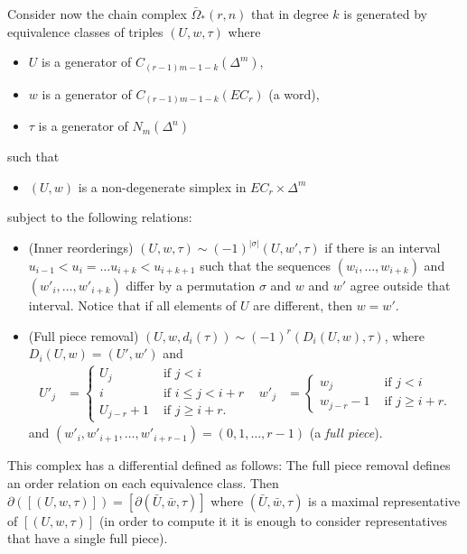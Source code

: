 Consider now the chain complex $\bar{\Omega}_*(r,n)$ that in degree $k$ is generated by equivalence classes of triples $(U,w,\tau)$ where 
\begin{itemize}
	\item $U$ is a generator of $C_{(r-1)m-1-k}(\Delta^m)$,
	\item $w$ is a generator of $C_{(r-1)m-1-k}(EC_r)$ (a word),
	\item $\tau$ is a generator of $N_m(\Delta^n)$
\end{itemize}
such that
\begin{itemize}
	\item $(U,w)$ is a non-degenerate simplex in $EC_r\times \Delta^m$
\end{itemize}
subject to the following relations:
\begin{itemize}
	\item (Inner reorderings) $(U,w,\tau)\sim (-1)^{|\sigma|}(U,w',\tau)$ if there is an interval $u_{i-1}<u_i =\ldots u_{i+k}<u_{i+k+1}$ such that the sequences $(w_i,\ldots,w_{i+k})$ and $(w'_i,\ldots,w'_{i+k})$ differ by a permutation $\sigma$ and $w$ and $w'$ agree outside that interval. Notice that if all elements of $U$ are different, then $w=w'$.
	\item (Full piece removal) $(U,w,d_i(\tau))\sim (-1)^r(D_i(U,w),\tau)$, where $D_i(U,w) = (U',w')$ and
	\begin{align*}
		U'_j &= \begin{cases} U_j &\text{ if $j<i$} \\ i & \text{ if $i\leq j < i+r$} \\ U_{j-r} + 1 & \text{ if $j\geq i+r$.}\end{cases} &
		w'_j &= \begin{cases} w_j &\text{ if $j<i$} \\ w_{j-r} - 1 & \text{ if $j\geq i+r$.}\end{cases}
	\end{align*}
	and $(w'_{i},w'_{i+1},\ldots,w'_{i+r-1}) = (0,1,\ldots,r-1)$ (a \emph{full piece}).
\end{itemize}
This complex has a differential defined as follows: The full piece removal defines an order relation on each equivalence class. Then $\partial([(U,w,\tau)]) = [\partial(\bar{U},\bar{w},\tau)]$ where $(\bar{U},\bar{w},\tau)$ is a maximal representative of $[(U,w,\tau)]$ (in order to compute it it is enough to consider representatives that have a single full piece).

